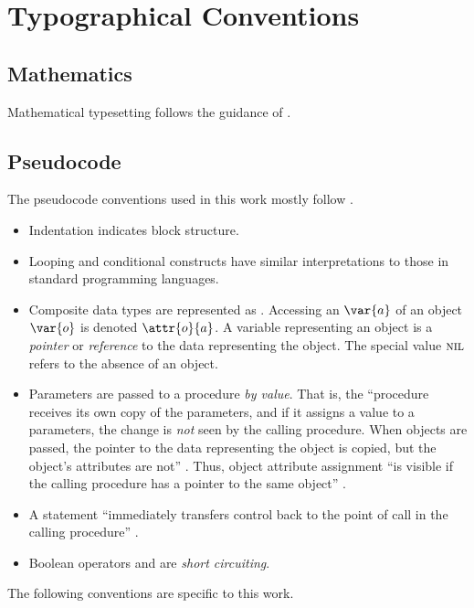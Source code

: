 \chapter{Typographical Conventions}\label{sec:conventions}

\section{Mathematics}

Mathematical typesetting follows the guidance of \cite{Dyer}.

\section{Pseudocode}

The pseudocode conventions used in this work mostly follow \cite[pp.
21--24]{Cormen2022}.
\begin{itemize}
    \item Indentation indicates block structure.
    \item Looping and conditional constructs have similar interpretations to
    those in standard programming languages.
    \item Composite data types are represented as . Accessing
    an  $\var{a}$ of an object $\var{o}$ is denoted
    $\attr{o}{a}$. A variable representing an object is a \emph{pointer} or
    \emph{reference} to the data representing the object. The special value
    $\textsc{nil}$ refers to the absence of an object.
    \item Parameters are passed to a procedure \emph{by value}. That is, the
    ``procedure receives its own copy of the parameters, and if it assigns a
    value to a parameters, the change is \emph{not} seen by the
    calling procedure. When objects are passed, the pointer to the data
    representing the object is copied, but the object's attributes are not''
    \cite[p. 23]{Cormen2022}. Thus, object attribute assignment ``is visible if
    the calling procedure has a pointer to the same object'' 
    \cite[p. 24]{Cormen2022}.
    \item A \Return statement ``immediately transfers control back to the point
    of call in the calling procedure'' \cite[p. 24]{Cormen2022}.
    \item Boolean operators {\AND} and {\OR} are \emph{short circuiting}.
\end{itemize}
The following conventions are specific to this work.
